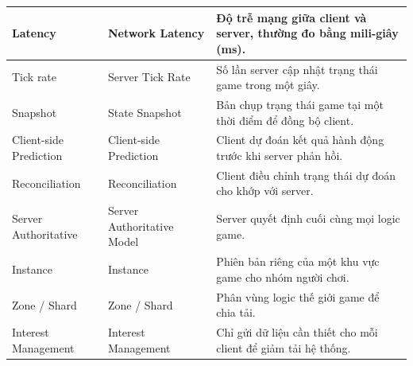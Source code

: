 \begin{longtable}{|L{3cm}|L{4cm}|L{8cm}|}
Latency & Network Latency &
Độ trễ mạng giữa client và server, thường đo bằng mili-giây (ms). \\ \hline

Tick rate & Server Tick Rate &
Số lần server cập nhật trạng thái game trong một giây. \\ \hline

Snapshot & State Snapshot &
Bản chụp trạng thái game tại một thời điểm để đồng bộ client. \\ \hline

Client-side Prediction & Client-side Prediction &
Client dự đoán kết quả hành động trước khi server phản hồi. \\ \hline

Reconciliation & Reconciliation &
Client điều chỉnh trạng thái dự đoán cho khớp với server. \\ \hline

Server Authoritative & Server Authoritative Model &
Server quyết định cuối cùng mọi logic game. \\ \hline

Instance & Instance &
Phiên bản riêng của một khu vực game cho nhóm người chơi. \\ \hline

Zone / Shard & Zone / Shard &
Phân vùng logic thế giới game để chia tải. \\ \hline

Interest Management & Interest Management &
Chỉ gửi dữ liệu cần thiết cho mỗi client để giảm tải hệ thống. \\ \hline

\end{longtable}
\fussy
